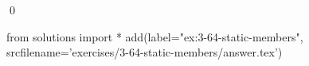 
\begin{ex}
  \label{ex:3-64-static-members}
  
  \qed
\end{ex}
\begin{python0}
from solutions import *
add(label="ex:3-64-static-members",
    srcfilename='exercises/3-64-static-members/answer.tex')
\end{python0}
